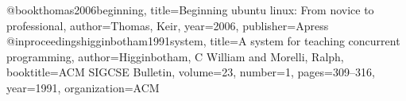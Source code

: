 @book{thomas2006beginning,
  title={Beginning ubuntu linux: From novice to professional},
  author={Thomas, Keir},
  year={2006},
  publisher={Apress}
}
@inproceedings{higginbotham1991system,
  title={A system for teaching concurrent programming},
  author={Higginbotham, C William and Morelli, Ralph},
  booktitle={ACM SIGCSE Bulletin},
  volume={23},
  number={1},
  pages={309--316},
  year={1991},
  organization={ACM}
}